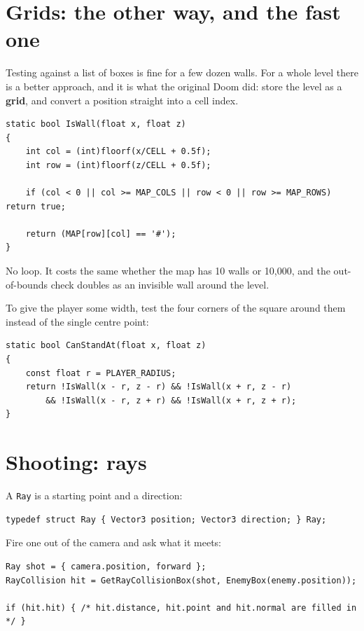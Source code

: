 \section{Grids: the other way, and the fast one}

Testing against a list of boxes is fine for a few dozen walls. For a whole level
there is a better approach, and it is what the original Doom did: store the level
as a \textbf{grid}, and convert a position straight into a cell index.

\begin{lstlisting}
static bool IsWall(float x, float z)
{
    int col = (int)floorf(x/CELL + 0.5f);
    int row = (int)floorf(z/CELL + 0.5f);

    if (col < 0 || col >= MAP_COLS || row < 0 || row >= MAP_ROWS) return true;

    return (MAP[row][col] == '#');
}
\end{lstlisting}

No loop. It costs the same whether the map has 10 walls or 10,000, and the
out-of-bounds check doubles as an invisible wall around the level.

To give the player some width, test the four corners of the square around them
instead of the single centre point:

\begin{lstlisting}
static bool CanStandAt(float x, float z)
{
    const float r = PLAYER_RADIUS;
    return !IsWall(x - r, z - r) && !IsWall(x + r, z - r)
        && !IsWall(x - r, z + r) && !IsWall(x + r, z + r);
}
\end{lstlisting}

\section{Shooting: rays}

A \lstinline|Ray| is a starting point and a direction:

\begin{lstlisting}
typedef struct Ray { Vector3 position; Vector3 direction; } Ray;
\end{lstlisting}

Fire one out of the camera and ask what it meets:

\begin{lstlisting}
Ray shot = { camera.position, forward };
RayCollision hit = GetRayCollisionBox(shot, EnemyBox(enemy.position));

if (hit.hit) { /* hit.distance, hit.point and hit.normal are filled in */ }
\end{lstlisting}


